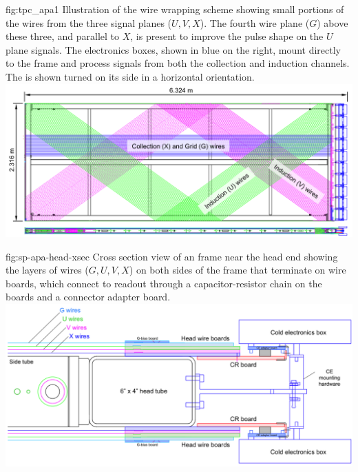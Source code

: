 \begin{dunefigure}{fig:tpc_apa1}
{Illustration of the   wire wrapping scheme showing small portions of the wires from the three signal planes ($U,V,X$). The fourth wire plane ($G$) above these three, and parallel to $X$, is present to improve the pulse shape on the $U$ plane signals. The  electronics boxes, shown in blue on the right, mount directly to the frame and process signals from both the collection and induction channels. The  is shown turned on its side in a horizontal orientation.} 
\includegraphics[width=\textwidth,trim = 0mm 10mm 0mm 0mm,clip]{graphics/sp-apa-drawing-wire-configuration.png} 
\end{dunefigure} 

\begin{dunefigure}{fig:sp-apa-head-xsec}
{Cross section view of an  frame near the head end showing the layers of wires ($G,U,V,X$) on both sides of the frame that terminate on wire boards, which connect to  readout  through a capacitor-resistor chain on the  boards and a connector adapter board.} 
\includegraphics[width=1\textwidth]{graphics/sp-apa-drawing-cross-section.png} 
\end{dunefigure} 


